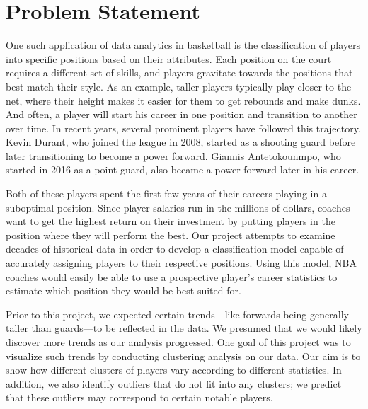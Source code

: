 \documentclass[./main.tex]{subfiles}
\begin{document}
\section{Problem Statement}
One such application of data analytics in basketball is the classification of players into specific positions based on their attributes. Each position on the court requires a different set of skills, and players gravitate towards the positions that best match their style. As an example, taller players typically play closer to the net, where their height makes it easier for them to get rebounds and make dunks. And often, a player will start his career in one position and transition to another over time. In recent years, several prominent players have followed this trajectory. Kevin Durant, who joined the league in 2008, started as a shooting guard before later transitioning to become a power forward. Giannis Antetokounmpo, who started in 2016 as a point guard, also became a power forward later in his career.

Both of these players spent the first few years of their careers playing in a suboptimal position. Since player salaries run in the millions of dollars, coaches want to get the highest return on their investment by putting players in the position where they will perform the best. Our project attempts to examine decades of historical data in order to develop a classification model capable of accurately assigning players to their respective positions. Using this model, NBA coaches would easily be able to use a prospective player's career statistics to estimate which position they would be best suited for.

Prior to this project, we expected  certain trends—like forwards being generally taller than guards—to be reflected in the data. We presumed that we would likely discover more trends as our analysis progressed. One goal of this project was to visualize such trends by conducting clustering analysis on our data. Our aim is to show how different clusters of players vary according to different statistics. In addition, we also identify outliers that do not fit into any clusters; we predict that these outliers may correspond to certain notable players.
\end{document}
